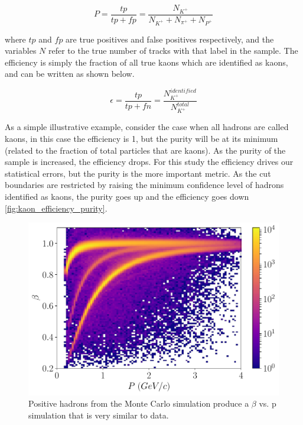 \begin{equation}
		P = \frac{tp}{tp + fp} = \frac{N_{K^+}}{N_{K^+} + N_{\pi^+} + N_{P^+}}
\end{equation}     

where $tp$ and $fp$ are true positives and false positives respectively, and the variables $N$ refer to the true number of tracks with that label in the sample.  The efficiency is simply the fraction of all true kaons which are identified as kaons, and can be written as shown below.   

\begin{equation}
	\epsilon = \frac{tp}{tp + fn} = \frac{N_{K^+}^{identified}}{N_{K^+}^{total}}
\end{equation}

As a simple illustrative example, consider the case when all hadrons are called kaons, in this case the efficiency is 1, but the purity will be at its minimum (related to the fraction of total particles that are kaons).  As the purity of the sample is increased, the efficiency drops.  For this study the efficiency drives our statistical errors, but the purity is the more important metric.  As the cut boundaries are restricted by raising the minimum confidence level of hadrons identified as kaons, the purity goes up and the efficiency goes down \ref{fig:kaon_efficiency_purity}.

\begin{figure}
	\centering
	\label{fig:beta_p_simulation}
	\includegraphics[width=15cm]{image/plots/hadron-id/beta_p_simulation.pdf}
	\caption{Positive hadrons from the Monte Carlo simulation produce a $\beta$  vs. p simulation that is very similar to data.}
\end{figure}

